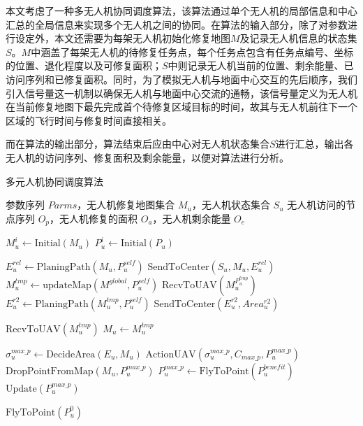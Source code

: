 \documentclass[AutoFakeBold]{LZUThesis}
\begin{document}
本文考虑了一种多无人机协同调度算法，该算法通过单个无人机的局部信息和中心汇总的全局信息来实现多个无人机之间的协同。在算法的输入部分，除了对参数进行设定外，本文还需要为每架无人机初始化修复地图$M$及记录无人机信息的状态集$S$。$M$中涵盖了每架无人机的待修复任务点，每个任务点包含有任务点编号、坐标的位置、退化程度以及可修复面积；$S$中则记录无人机当前的位置、剩余能量、已访问序列和已修复面积。同时，为了模拟无人机与地面中心交互的先后顺序，我们引入信号量这一机制以确保无人机与地面中心交流的通畅，该信号量定义为无人机在当前修复地图下最先完成首个待修复区域目标的时间，故其与无人机前往下一个区域的飞行时间与修复时间直接相关。

而在算法的输出部分，算法结束后应由中心对无人机状态集合$S$进行汇总，输出各无人机的访问序列、修复面积及剩余能量，以便对算法进行分析。

\begin{algorithm}[H]
	\caption{多元人机协同调度算法}
	\label{alg:multi_uav_scheduling}
	\begin{algorithmic}[1]
		\Require 参数序列 $Parms$，无人机修复地图集合 $M_u$，无人机状态集合 $S_u$
		\Ensure 无人机访问的节点序列 $O_p$，无人机修复的面积 $O_a$，无人机剩余能量 $O_e$

		\State $M_u^i \gets \text{Initial}(M_u)$ 
		\State $P_u^i \gets \text{Initial}(P_u)$ 

		\State $E_u^{rel} \gets \text{PlaningPath}(M_u, P_u^{self})$ 
		\State $\text{SendToCenter}(S_u, M_u, E_u^{rel})$ 
		\State $M_u^{tmp} \gets \text{updateMap}(M^{global}, P_u^{self})$ 
		\State $\text{RecvToUAV}(M_u^{P_u^{tmp}})$ 
		\State $E_u^{r2} \gets \text{PlaningPath}(M_u^{tmp}, P_u^{self})$ 
		\State $\text{SendToCenter}(E_u^{r2}, Area_u^{r2})$ 

		\State $\text{RecvToUAV}(M_u^{tmp})$ 
		\State $M_u \gets M_u^{tmp}$
		\EndIf

		\State $\sigma_u^{max\_p} \gets \text{DecideArea}(E_u, M_u)$ 
		\State $\text{ActionUAV}(\sigma_u^{max\_p}, C_{max\_p}, P_u^{max\_p})$ 
		\State $\text{DropPointFromMap}(M_u, P_u^{max\_p})$
		\State $P_u^{max\_p} \gets \text{FlyToPoint}(P_u^{benefit})$ 
		\State $\text{Update}(P_u^{max\_p})$ 
		\EndWhile

		\State $\text{FlyToPoint}(P_u^0)$ 
	\end{algorithmic}
\end{algorithm}
\end{document}
